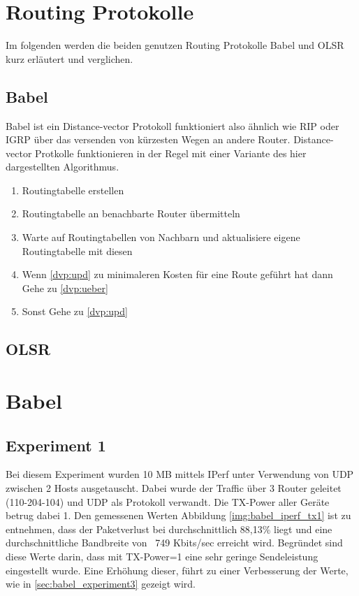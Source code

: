 \documentclass[10pt]{scrartcl}
\begin{document}
	
		
		
	
	
\section{Routing Protokolle}
	Im folgenden werden die beiden genutzen Routing Protokolle Babel und OLSR kurz erläutert und verglichen.
	
	\subsection{Babel}
	Babel ist ein Distance-vector Protokoll funktioniert also ähnlich wie RIP oder IGRP über das versenden von kürzesten Wegen an andere Router. Distance-vector Protkolle funktionieren in der Regel mit einer Variante des hier dargestellten Algorithmus.
	
	\begin{enumerate}
		\item Routingtabelle erstellen
		\item \label{dvp:ueber} Routingtabelle an benachbarte Router übermitteln
		\item \label{dvp:upd} Warte auf Routingtabellen von Nachbarn und aktualisiere eigene Routingtabelle mit diesen
		\item Wenn \ref{dvp:upd} zu minimaleren Kosten für eine Route geführt hat dann
			\subitem Gehe zu \ref{dvp:ueber}
		\item Sonst
			\subitem Gehe zu \ref{dvp:upd}
	\end{enumerate}
	
	
	
	\subsection{OLSR}

\section{Babel}
	\subsection{Experiment 1}\label{sec:babel_experiment1}
	Bei diesem Experiment wurden 10 MB mittels IPerf  unter Verwendung von UDP zwischen 2 Hosts ausgetauscht. Dabei wurde der Traffic über 3 Router geleitet (110-204-104) und UDP als Protokoll verwandt. Die TX-Power aller Geräte betrug dabei 1. 
Den gemessenen Werten Abbildung \ref{img:babel_iperf_tx1} ist zu entnehmen, dass der Paketverlust bei durchschnittlich 88,13\% liegt und eine durchschnittliche Bandbreite von ~749 Kbits/sec erreicht wird.
Begründet sind diese Werte darin, dass mit TX-Power=1 eine sehr geringe Sendeleistung eingestellt wurde. Eine Erhöhung dieser, führt zu einer Verbesserung der Werte, wie in \ref{sec:babel_experiment3} gezeigt wird.
\end{document}
